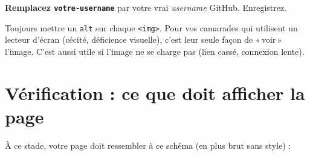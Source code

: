 \documentclass[11pt,a4paper]{article}
\newcommand{\cmark}{\ding{51}}
\begin{document}
\textbf{Remplacez \texttt{votre-username}} par votre vrai \emph{username}
GitHub. Enregistrez. \cmark

\begin{attentionbox}
Toujours mettre un \texttt{alt} sur chaque \texttt{<img>}. Pour vos
camarades qui utilisent un lecteur d'écran (cécité, déficience visuelle),
c'est leur seule façon de «\,voir\,» l'image. C'est aussi utile si
l'image ne se charge pas (lien cassé, connexion lente).
\end{attentionbox}

\newpage

\section{Vérification : ce que doit afficher la page}

À ce stade, votre page doit ressembler à ce schéma (en plus brut sans
style) :
\end{document}
